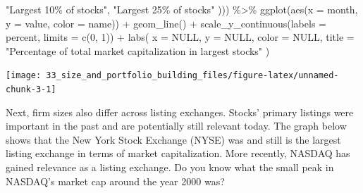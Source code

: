 \documentclass[
]{krantz}
\newenvironment{Shaded}{\begin{snugshade}}{\end{snugshade}}
\newcommand{\AttributeTok}[1]{\textcolor[rgb]{0.61,0.61,0.61}{#1}}
\newcommand{\ConstantTok}[1]{\textcolor[rgb]{0,0,0}{#1}}
\newcommand{\DecValTok}[1]{\textcolor[rgb]{0.06,0.06,0.06}{#1}}
\newcommand{\FunctionTok}[1]{\textcolor[rgb]{0,0,0}{#1}}
\newcommand{\NormalTok}[1]{#1}
\newcommand{\SpecialCharTok}[1]{\textcolor[rgb]{0,0,0}{#1}}
\newcommand{\StringTok}[1]{\textcolor[rgb]{0.5,0.5,0.5}{#1}}
\begin{document}
\begin{Shaded}
\begin{Highlighting}[]
    \StringTok{"Largest 10\% of stocks"}\NormalTok{, }\StringTok{"Largest 25\% of stocks"}
\NormalTok{  ))) }\SpecialCharTok{\%\textgreater{}\%}
  \FunctionTok{ggplot}\NormalTok{(}\FunctionTok{aes}\NormalTok{(}\AttributeTok{x =}\NormalTok{ month, }\AttributeTok{y =}\NormalTok{ value, }\AttributeTok{color =}\NormalTok{ name)) }\SpecialCharTok{+}
  \FunctionTok{geom\_line}\NormalTok{() }\SpecialCharTok{+}
  \FunctionTok{scale\_y\_continuous}\NormalTok{(}\AttributeTok{labels =}\NormalTok{ percent, }\AttributeTok{limits =} \FunctionTok{c}\NormalTok{(}\DecValTok{0}\NormalTok{, }\DecValTok{1}\NormalTok{)) }\SpecialCharTok{+}
  \FunctionTok{labs}\NormalTok{(}
    \AttributeTok{x =} \ConstantTok{NULL}\NormalTok{, }\AttributeTok{y =} \ConstantTok{NULL}\NormalTok{, }\AttributeTok{color =} \ConstantTok{NULL}\NormalTok{,}
    \AttributeTok{title =} \StringTok{"Percentage of total market capitalization in largest stocks"}
\NormalTok{  )}
\end{Highlighting}
\end{Shaded}

\begin{center}\texttt{[image: 33\_size\_and\_portfolio\_building\_files/figure-latex/unnamed-chunk-3-1]} \end{center}

Next, firm sizes also differ across listing exchanges. Stocks' primary listings were important in the past and are potentially still relevant today. The graph below shows that the New York Stock Exchange (NYSE) was and still is the largest listing exchange in terms of market capitalization. More recently, NASDAQ has gained relevance as a listing exchange. Do you know what the small peak in NASDAQ's market cap around the year 2000 was?
\end{document}
